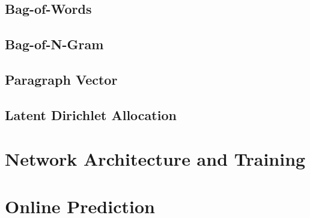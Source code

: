 \subsection{Bag-of-Words}
\subsection{Bag-of-N-Gram}
\subsection{Paragraph Vector}
\subsection{Latent Dirichlet Allocation}

\section{Network Architecture and Training}

\section{Online Prediction}